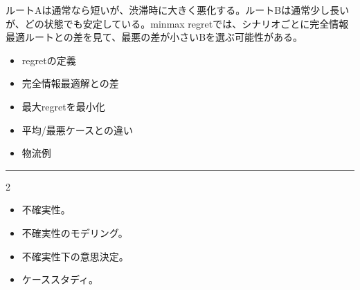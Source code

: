 ルートAは通常なら短いが、渋滞時に大きく悪化する。ルートBは通常少し長いが、どの状態でも安定している。minmax regretでは、シナリオごとに完全情報最適ルートとの差を見て、最悪の差が小さいBを選ぶ可能性がある。\par
{}
\begin{itemize}
\item regretの定義
\item 完全情報最適解との差
\item 最大regretを最小化
\item 平均/最悪ケースとの違い
\item 物流例
\end{itemize}
\vspace{2mm}\hrule\vspace{2mm}

\clearpage
{}
\begin{multicols}{2}\scriptsize\raggedcolumns
{}
\begin{itemize}
\item 不確実性。
\item 不確実性のモデリング。
\item 不確実性下の意思決定。
\item ケーススタディ。
\end{itemize}
\end{multicols}

